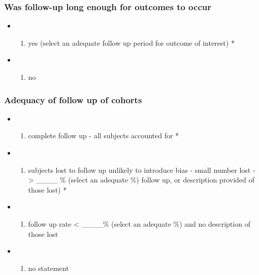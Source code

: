 \documentclass[
  doc, a4paper]{apa7}
\providecommand{\tightlist}{%
  \setlength{\itemsep}{0pt}\setlength{\parskip}{0pt}}
\begin{document}
\subsubsection{Was follow-up long enough for outcomes to occur}\label{was-follow-up-long-enough-for-outcomes-to-occur}

\begin{itemize}
\tightlist
\item
  \begin{enumerate}
  \def\labelenumi{\alph{enumi})}
  \tightlist
  \item
    yes (select an adequate follow up period for outcome of interest) *
  \end{enumerate}
\item
  \begin{enumerate}
  \def\labelenumi{\alph{enumi})}
  \setcounter{enumi}{1}
  \tightlist
  \item
    no
  \end{enumerate}
\end{itemize}

\subsubsection{Adequacy of follow up of cohorts}\label{adequacy-of-follow-up-of-cohorts}

\begin{itemize}
\tightlist
\item
  \begin{enumerate}
  \def\labelenumi{\alph{enumi})}
  \tightlist
  \item
    complete follow up - all subjects accounted for *
  \end{enumerate}
\item
  \begin{enumerate}
  \def\labelenumi{\alph{enumi})}
  \setcounter{enumi}{1}
  \tightlist
  \item
    subjects lost to follow up unlikely to introduce bias - small number lost - \textgreater{} \_\_\_\_ \% (select an adequate \%) follow up, or description provided of those lost) *
  \end{enumerate}
\item
  \begin{enumerate}
  \def\labelenumi{\alph{enumi})}
  \setcounter{enumi}{2}
  \tightlist
  \item
    follow up rate \textless{} \_\_\_\_\% (select an adequate \%) and no description of those lost
  \end{enumerate}
\item
  \begin{enumerate}
  \def\labelenumi{\alph{enumi})}
  \setcounter{enumi}{3}
  \tightlist
  \item
    no statement
  \end{enumerate}
\end{itemize}
\end{document}
